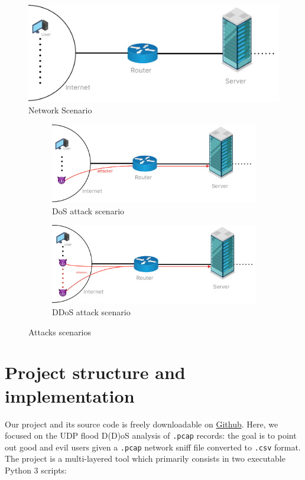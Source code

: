 \begin{figure}[ht]
  \includegraphics[scale=0.31]{imgs/scenario.png}
  \caption{Network Scenario}
  \label{fig:networkscenario}
\end{figure}

\begin{figure}[h]
	\begin{subfigure}{0.48\textwidth}
		\includegraphics[width=\textwidth]{imgs/DoS_attack.png}
		\caption{DoS attack scenario} \label{fig:DoS}
	\end{subfigure}
	\hspace*{\fill} %
	\begin{subfigure}{0.48\textwidth}
		\includegraphics[width=\textwidth]{imgs/DDoS_attack.png}
		\caption{DDoS attack scenario} \label{fig:DDoS}
	\end{subfigure}
	\caption{Attacks scenarios}
	\label{fig:atks}
\end{figure}

\section{Project structure and implementation}
\label{sec:projstruct}
Our project \cite{proj_repo} and its source code is freely downloadable on \href{https://github.com/CristianTuretta/DDoS-Network-Flow-Forensics-Analyser-.git}{Github}. Here, we focused on the UDP flood D(D)oS analysis of \texttt{.pcap} records: the goal is to point out good and evil users given a \texttt{.pcap} network sniff file converted to \texttt{.csv} format. The project is a multi-layered tool which primarily consists in two executable Python 3 scripts:

